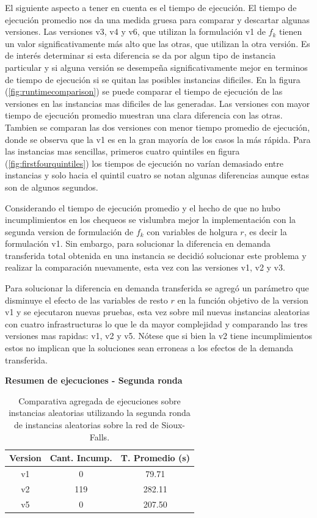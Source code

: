 \documentclass{article}
\begin{document}
  El siguiente aspecto a tener en cuenta es el tiempo de ejecución. El tiempo de ejecución promedio nos da una medida gruesa para comparar y descartar algunas versiones. Las versiones v3, v4 y v6, que utilizan la formulación v1 de $f_k$ tienen un valor significativamente más alto que las otras, que utilizan la otra versión. Es de interés determinar si esta diferencia se da por algun tipo de instancia particular y si alguna versión se desempeña significativamente mejor en terminos de tiempo de ejecución si se quitan las posibles instancias dificiles. En la figura (\ref{fig:runtimecomparison}) se puede comparar el tiempo de ejecución de las versiones en las instancias mas dificiles de las generadas. Las versiones con mayor tiempo de ejecución promedio muestran una clara diferencia con las otras. Tambien se comparan las dos versiones con menor tiempo promedio de ejecución, donde se observa que la v1 es en la gran mayoría de los casos la más rápida. Para las instancias mas sencillas, primeros cuatro quintiles en figura (\ref{fig:firstfourquintiles}) los tiempos de ejecución no varían demasiado entre instancias y solo hacia el quintil cuatro se notan algunas diferencias aunque estas son de algunos segundos.

  Considerando el tiempo de ejecución promedio y el hecho de que no hubo incumplimientos en los chequeos se vislumbra mejor la implementación con la segunda version de formulación de $f_k$ con variables de holgura $r$, es decir la formulación v1. Sin embargo, para solucionar la diferencia en demanda transferida total obtenida en una instancia se decidió solucionar este problema y realizar la comparación nuevamente, esta vez con las versiones v1, v2 y v3.

  Para solucionar la diferencia en demanda transferida se agregó un parámetro que disminuye el efecto de las variables de resto $r$ en la función objetivo de la version v1 y se ejecutaron nuevas pruebas, esta vez sobre mil nuevas instancias aleatorias con cuatro infrastructuras lo que le da mayor complejidad y comparando las tres versiones mas rapidas: v1, v2 y v5. Nótese que si bien la v2 tiene incumplimientos estos no implican que la soluciones sean erroneas a los efectos de la demanda transferida.

  \begin{table}[h!]
    \centering
    \caption*{{\bf Resumen de ejecuciones - Segunda ronda}}
    \begin{tabular}{ccc}
      \toprule
      Version & Cant. Incump. & T. Promedio (s) \\
      \midrule
      v1 & 0   & 79.71   \\
      v2 & 119 & 282.11  \\
      v5 & 0   & 207.50  \\
      \bottomrule
    \end{tabular}
    \caption{Comparativa agregada de ejecuciones sobre instancias aleatorias utilizando la segunda ronda de instancias aleatorias sobre la red de Sioux-Falls.}\label{table:resumenreejecuciones}
  \end{table}
\end{document}
